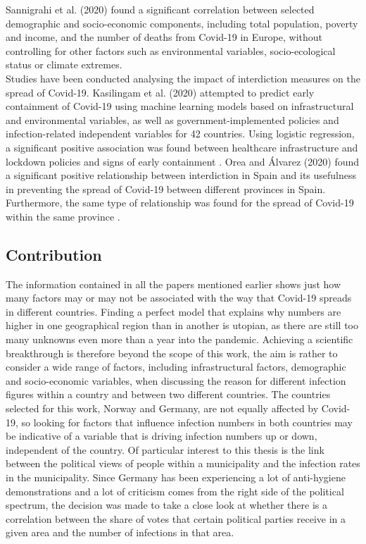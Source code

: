 Sannigrahi et al. (2020) found a significant correlation between selected demographic and socio-economic components, including total population, poverty and income, and the number of deaths from Covid-19 in Europe, without controlling for other factors such as environmental variables, socio-ecological status or climate extremes\autocite[][]{sannigrahi2020examining}. \\
Studies have been conducted analysing the impact of interdiction measures on the spread of Covid-19. Kasilingam et al. (2020) attempted to predict early containment of Covid-19 using machine learning models based on infrastructural and environmental variables, as well as government-implemented policies and infection-related independent variables for 42 countries. Using logistic regression, a significant positive association was found between healthcare infrastructure and lockdown policies and signs of early containment \autocite[][]{kasilingam2020exploring}.
Orea and Álvarez (2020) found a significant positive relationship between interdiction in Spain and its usefulness in preventing the spread of Covid-19 between different provinces in Spain. Furthermore, the same type of relationship was found for the spread of Covid-19 within the same province \autocite[][]{orea2020effective}. \\
\subsection*{Contribution}
The information contained in all the papers mentioned earlier shows just how many factors may or may not be associated with the way that Covid-19 spreads in different countries. Finding a perfect model that explains why numbers are higher in one geographical region than in another is utopian, as there are still too many unknowns even more than a year into the pandemic. Achieving a scientific breakthrough is therefore beyond the scope of this work, the aim is rather to consider a wide range of factors, including infrastructural factors, demographic and socio-economic variables, when discussing the reason for different infection figures within a country and between two different countries. The countries selected for this work, Norway and Germany, are not equally affected by Covid-19, so looking for factors that influence infection numbers in both countries may be indicative of a variable that is driving infection numbers up or down, independent of the country. Of particular interest to this thesis is the link between the political views of people within a municipality and the infection rates in the municipality. Since Germany has been experiencing a lot of anti-hygiene demonstrations and a lot of criticism comes from the right side of the political spectrum, the decision was made to take a close look at whether there is a correlation between the share of votes that certain political parties receive in a given area and the number of infections in that area.
\clearpage
